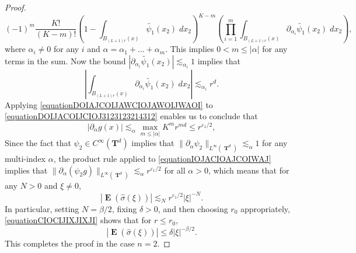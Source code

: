 \documentclass[12pt,reqno]{article}
\numberwithin{equation}{section}
\DeclareMathOperator{\TT}{\mathbf{T}}
\numberwithin{theorem}{section}
\DeclareMathOperator{\EE}{\mathbf{E}}
\begin{document}
\begin{proof}
\begin{equation}
        (-1)^m \frac{K!}{(K-m)!} \left( 1 - \int_{B_{(L+1) r}(x)} \tilde{\psi_1}(x_2)\; dx_2 \right)^{K-m} \left( \prod_{i = 1}^{m} \int_{B_{(L+1)r}(x)} \partial_{\alpha_i} \tilde{\psi_1}(x_2)\; dx_2 \right),
    \end{equation}
    where $\alpha_i \neq 0$ for any $i$ and $\alpha = \alpha_1 + \dots + \alpha_m$. This implies $0 < m \leq |\alpha|$ for any terms in the sum. Now the bound $|\partial_{\alpha_i} \tilde{\psi_1}(x_2)| \lesssim_{\alpha_i} 1$ implies that
    \begin{equation} \label{equationDOIAJCOIJAWCIOJAWOIJWAOI}
        \left| \int_{B_{(L+1)r}(x)} \partial_{\alpha_i} \tilde{\psi_1}(x_2)\; dx_2 \right| \lesssim_{\alpha_i} r^d.
    \end{equation}
    Applying \eqref{equationDOIAJCOIJAWCIOJAWOIJWAOI} to \eqref{equationDOIJACOIJCIOJ3123123214312} enables us to conclude that
    \begin{equation} \label{equationIOJACIOAJCOIWAJ}
        |\partial_\alpha g(x)| \lesssim_\alpha \max_{m \leq |\alpha|} K^m r^{md} \leq r^{\varepsilon_1/2},
    \end{equation}
    Since the fact that $\psi_2 \in C^\infty(\mathbf{T}^d)$ implies that $\| \partial_\alpha \psi_2 \|_{L^\infty(\TT^d)} \lesssim_\alpha 1$ for any multi-index $\alpha$, the product rule applied to \eqref{equationIOJACIOAJCOIWAJ} implies that $\| \partial_\alpha (\psi_2 g) \|_{L^\infty(\TT^d)} \lesssim_\alpha r^{\varepsilon_1/2}$ for all $\alpha > 0$, which means that for any $N > 0$ and $\xi \neq 0$,
    \begin{equation} \label{equationCIOCIJIXJIXJI}
        |\EE(\widehat{\sigma}(\xi))| \lesssim_N r^{\varepsilon_1/2} |\xi|^{-N}.
    \end{equation}
    In particular, setting $N = \beta/2$, fixing $\delta > 0$, and then choosing $r_0$ appropriately, \eqref{equationCIOCIJIXJIXJI} shows that for $r \leq r_0$,
    \begin{equation}
        |\EE(\widehat{\sigma}(\xi))| \leq \delta |\xi|^{-\beta/2}.
    \end{equation}
    This completes the proof in the case $n = 2$.


\end{proof}
\end{document}
